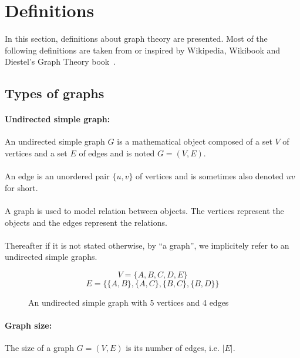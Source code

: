 \section{Definitions}
In this section, definitions about graph theory are presented. Most
of the following definitions are taken from or inspired by Wikipedia,
Wikibook and Diestel's Graph Theory book~\cite{Diestel}.

\subsection{Types of graphs}
\paragraph{Undirected simple graph:}
An undirected simple graph $G$ is a mathematical object composed of a set $V$ of
vertices and a set $E$ of edges and is noted $G = (V,E)$.

\paragraph{}
An edge is an unordered pair $\{u,v\}$ of vertices and is sometimes also denoted
$uv$ for short.

\paragraph{}
A graph is used to model relation between objects. The vertices represent the 
objects and the edges represent the relations.

\paragraph{}
Thereafter if it is not stated otherwise, by ``a graph'', we implicitely
refer to an undirected simple graphs.


\begin{figure}[!h]
  \caption{An undirected simple graph with 5 vertices and 4 edges}
  \begin{center}
    
  \end{center}
  $$V = \{A,B,C,D,E\}$$
  $$E = \Big\{\{A,B\},\{A,C\},\{B,C\},\{B,D\}\Big\}$$
\end{figure}

\paragraph{Graph size:}
The size of a graph $G=(V,E)$ is its number of edges, i.e. $|E|$.

